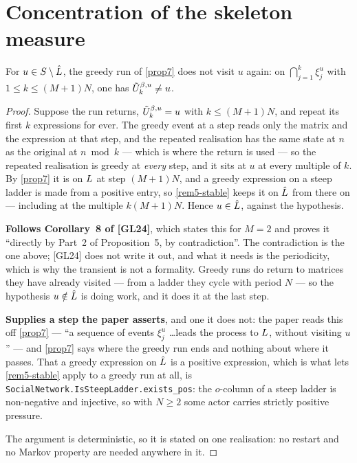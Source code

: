\section{Concentration of the skeleton measure}

\begin{lemma}
  \label{aux-greedy-avoids}
  \leanok
  For $u \in S \setminus \hat{L}$, the greedy run of \ref{prop7} does not
  visit $u$ again: on $\bigcap_{j=1}^{k} \xi_j^u$ with $1 \le k \le (M+1)N$,
  one has $\tilde{U}^{\beta,u}_k \ne u$.
\end{lemma}
\begin{proof}
  \leanok
  Suppose the run returns, $\tilde{U}^{\beta,u}_k = u$ with $k \le (M+1)N$, and repeat its
  first $k$ expressions for ever.  The greedy event at a step reads only the
  matrix and the expression at that step, and the repeated realisation has the
  same state at $n$ as the original at $n \bmod k$ --- which is where the return
  is used --- so the repeated realisation is greedy at \emph{every} step, and it
  sits at $u$ at every multiple of $k$.  By \ref{prop7} it is on $L$ at
  step $(M+1)N$, and a greedy expression on a steep ladder is made from a
  positive entry, so \ref{rem5-stable} keeps it on $\hat{L}$ from there on ---
  including at the multiple $k(M+1)N$.  Hence $u \in \hat{L}$, against the
  hypothesis.

  \textbf{Follows Corollary~8 of [GL24]}, which states this for $M = 2$ and
  proves it ``directly by Part~2 of Proposition~5, by contradiction''.  The
  contradiction is the one above; [GL24] does not write it out, and what it
  needs is the periodicity, which is why the transient is not a formality.
  Greedy runs do return to matrices they have already visited --- from a ladder
  they cycle with period $N$ --- so the hypothesis $u \notin \hat{L}$ is doing
  work, and it does it at the last step.

  \textbf{Supplies a step the paper asserts}, and one it does not: the paper
  reads this off \ref{prop7} --- ``a sequence of events $\xi_j^u$ \dots leads
  the process to $L$, without visiting $u$'' --- and \ref{prop7} says
  where the greedy run ends and nothing about where it passes.  That a greedy
  expression on $\hat{L}$ is a positive expression, which is what lets
  \ref{rem5-stable} apply to a greedy run at all, is
  \texttt{SocialNetwork.IsSteepLadder.exists\_pos}: the $o$-column of a steep
  ladder is non-negative and injective, so with $N \ge 2$ some actor carries
  strictly positive pressure.

  The argument is deterministic, so it is stated on one realisation: no restart
  and no Markov property are needed anywhere in it.
\end{proof}

